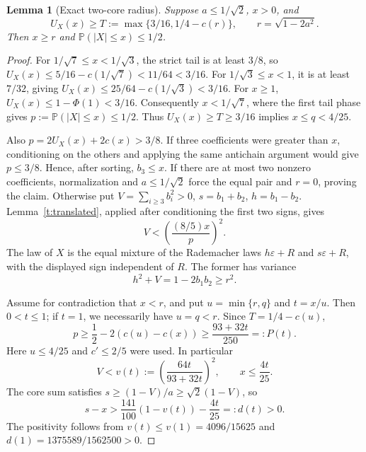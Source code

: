 \documentclass[11pt]{article}
\newtheorem{lemma}[theorem]{Lemma}
\theoremstyle{remark}\newtheorem{remark}[theorem]{Remark}
\newcommand{\Pp}{\mathbb P}
\begin{document}
\begin{lemma}[Exact two-core radius]\label{t:radius}
Suppose $a\le1/\sqrt2$, $x>0$, and
\[
 U_X(x)\ge T:=\max\{3/16,1/4-c(r)\},\qquad r=\sqrt{1-2a^2}.
\]
Then $x\ge r$ and $\Pp(|X|\le x)\le1/2$.
\end{lemma}
\begin{proof}
For $1/\sqrt7\le x<1/\sqrt3$, the strict tail is at least $3/8$,
so $U_X(x)\le5/16-c(1/\sqrt7)<11/64<3/16$.
For $1/\sqrt3\le x<1$, it is at least $7/32$, giving
$U_X(x)\le25/64-c(1/\sqrt3)<3/16$.
For $x\ge1$, $U_X(x)\le1-\Phi(1)<3/16$.
Consequently $x<1/\sqrt7$, where the first tail phase gives
$p:=\Pp(|X|\le x)\le1/2$. Thus $U_X(x)\ge T\ge3/16$
implies $x\le q<4/25$.

Also $p=2U_X(x)+2c(x)>3/8$. If three coefficients were greater
than $x$, conditioning on the others and applying the same antichain
argument would give $p\le3/8$. Hence, after sorting, $b_3\le x$.
If there are at most two nonzero coefficients, normalization and
$a\le1/\sqrt2$ force the equal pair and $r=0$, proving the claim.
Otherwise put $V=\sum_{i\ge3}b_i^2>0$, $s=b_1+b_2$, $h=b_1-b_2$.
Lemma~\ref{t:translated}, applied after conditioning the first two
signs, gives
\[
 V<\left(\frac{(8/5)x}{p}\right)^2.
\]
The law of $X$ is the equal mixture of the Rademacher laws
$h\varepsilon+R$ and $s\varepsilon+R$, with the displayed sign
independent of $R$. The former has variance
\[
 h^2+V=1-2b_1b_2\ge r^2.
\]

Assume for contradiction that $x<r$, and put
$u=\min\{r,q\}$ and $t=x/u$. Then $0<t\le1$; if $t=1$,
we necessarily have $u=q<r$. Since $T=1/4-c(u)$,
\[
 p\ge\frac12-2(c(u)-c(x))
 \ge\frac{93+32t}{250}=:P(t).
\]
Here $u\le4/25$ and $c'\le2/5$ were used. In particular
\[
 V<v(t):=\left(\frac{64t}{93+32t}\right)^2,
 \qquad x\le\frac{4t}{25}.
\]
The core sum satisfies $s\ge(1-V)/a\ge\sqrt2(1-V)$, so
\[
 s-x>\frac{141}{100}(1-v(t))-\frac{4t}{25}=:d(t)>0.
\]
The positivity follows from $v(t)\le v(1)=4096/15625$ and
$d(1)=1375589/1562500>0$.


\end{proof}
\end{document}
